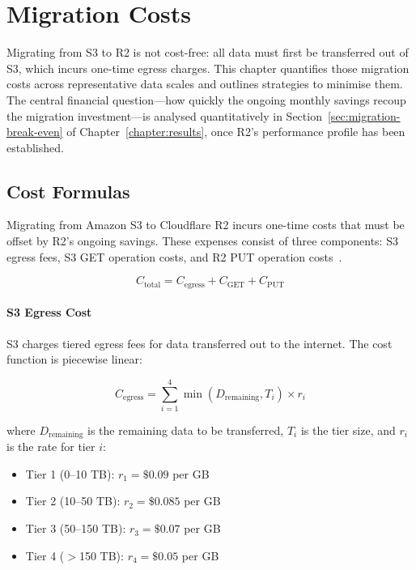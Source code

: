
\chapter{Migration Costs}\label{chapter:migration}

Migrating from S3 to R2 is not cost-free: all data must first be transferred out of S3, which incurs one-time egress charges. This chapter quantifies those migration costs across representative data scales and outlines strategies to minimise them. The central financial question---how quickly the ongoing monthly savings recoup the migration investment---is analysed quantitatively in Section~\ref{sec:migration-break-even} of Chapter~\ref{chapter:results}, once R2's performance profile has been established.

\section{Cost Formulas}\label{sec:cost-formulas}

Migrating from Amazon S3 to Cloudflare R2 incurs one-time costs that must be offset by R2's ongoing savings. These expenses consist of three components: S3 egress fees, S3 GET operation costs, and R2 PUT operation costs~\cite{aws-s3-pricing,cloudflare-r2-pricing}.

\begin{equation}
C_{\text{total}} = C_{\text{egress}} + C_{\text{GET}} + C_{\text{PUT}}
\end{equation}

\subsubsection{S3 Egress Cost}

S3 charges tiered egress fees for data transferred out to the internet. The cost function is piecewise linear:

\begin{equation}
C_{\text{egress}} = \sum_{i=1}^{4} \min(D_{\text{remaining}}, T_i) \times r_i
\end{equation}

where $D_{\text{remaining}}$ is the remaining data to be transferred, $T_i$ is the tier size, and $r_i$ is the rate for tier $i$:

\begin{itemize}
    \item Tier 1 (0–10 TB): $r_1 = \$0.09$ per GB
    \item Tier 2 (10–50 TB): $r_2 = \$0.085$ per GB
    \item Tier 3 (50–150 TB): $r_3 = \$0.07$ per GB
    \item Tier 4 ($>$150 TB): $r_4 = \$0.05$ per GB
\end{itemize}


